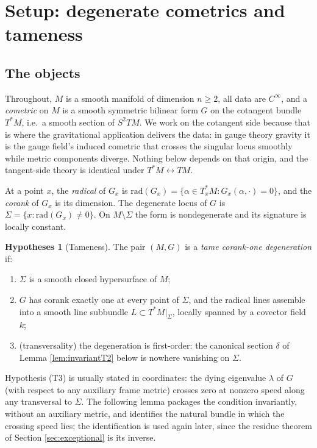\documentclass[11pt]{article}
\theoremstyle{definition}
\newtheorem{hypothesis}[theorem]{Hypotheses}
\newcommand{\rad}{\mathrm{rad}}
\newcommand{\shL}{L}
\newcommand{\Sig}{\Sigma}
\begin{document}
\section{Setup: degenerate cometrics and tameness}\label{sec:setup}

\subsection{The objects}\label{subsec:objects}

Throughout, $M$ is a smooth manifold of dimension $n \geq 2$, all data are $C^\infty$, and a \emph{cometric} on $M$ is a smooth symmetric bilinear form $G$ on the cotangent bundle $T^*M$, i.e.\ a smooth section of $S^2 TM$. We work on the cotangent side because that is where the gravitational application delivers the data: in gauge theory gravity it is the gauge field's induced cometric that crosses the singular locus smoothly while metric components diverge. Nothing below depends on that origin, and the tangent-side theory is identical under $T^*M \leftrightarrow TM$.

At a point $x$, the \emph{radical} of $G_x$ is $\rad(G_x) = \{\alpha \in T^*_xM : G_x(\alpha, \cdot) = 0\}$, and the \emph{corank} of $G_x$ is its dimension. The degenerate locus of $G$ is $\Sig = \{x : \rad(G_x) \neq 0\}$. On $M \setminus \Sig$ the form is nondegenerate and its signature is locally constant.

\begin{hypothesis}[Tameness]\label{hyp:tame}
The pair $(M, G)$ is a \emph{tame corank-one degeneration} if:
\begin{enumerate}
\item[(T1)] $\Sig$ is a smooth closed hypersurface of $M$;
\item[(T2)] $G$ has corank exactly one at every point of $\Sig$, and the radical lines assemble into a smooth line subbundle $\shL \subset T^*M|_\Sig$, locally spanned by a covector field $k$;
\item[(T3)] (transversality) the degeneration is first-order: the canonical section $\delta$ of Lemma \ref{lem:invariantT2} below is nowhere vanishing on $\Sig$.
\end{enumerate}
\end{hypothesis}

Hypothesis (T3) is usually stated in coordinates: the dying eigenvalue $\lambda$ of $G$ (with respect to any auxiliary frame metric) crosses zero at nonzero speed along any transversal to $\Sig$. The following lemma packages the condition invariantly, without an auxiliary metric, and identifies the natural bundle in which the crossing speed lies; the identification is used again later, since the residue theorem of Section \ref{sec:exceptional} is its inverse.
\end{document}
